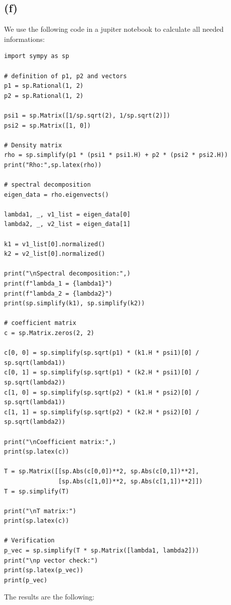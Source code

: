 \documentclass{article}
\begin{document}
\subsection*{(f)}
We use the following code in a jupiter notebook to calculate all needed informations:
\begin{verbatim}
import sympy as sp

# definition of p1, p2 and vectors
p1 = sp.Rational(1, 2)
p2 = sp.Rational(1, 2)

psi1 = sp.Matrix([1/sp.sqrt(2), 1/sp.sqrt(2)])
psi2 = sp.Matrix([1, 0])

# Density matrix
rho = sp.simplify(p1 * (psi1 * psi1.H) + p2 * (psi2 * psi2.H))
print("Rho:",sp.latex(rho))

# spectral decomposition
eigen_data = rho.eigenvects()

lambda1, _, v1_list = eigen_data[0]
lambda2, _, v2_list = eigen_data[1]

k1 = v1_list[0].normalized()
k2 = v2_list[0].normalized()

print("\nSpectral decomposition:",)
print(f"lambda_1 = {lambda1}")
print(f"lambda_2 = {lambda2}")
print(sp.simplify(k1), sp.simplify(k2))

# coefficient matrix
c = sp.Matrix.zeros(2, 2)

c[0, 0] = sp.simplify(sp.sqrt(p1) * (k1.H * psi1)[0] / sp.sqrt(lambda1))
c[0, 1] = sp.simplify(sp.sqrt(p1) * (k2.H * psi1)[0] / sp.sqrt(lambda2))
c[1, 0] = sp.simplify(sp.sqrt(p2) * (k1.H * psi2)[0] / sp.sqrt(lambda1))
c[1, 1] = sp.simplify(sp.sqrt(p2) * (k2.H * psi2)[0] / sp.sqrt(lambda2))

print("\nCoefficient matrix:",)
print(sp.latex(c))

T = sp.Matrix([[sp.Abs(c[0,0])**2, sp.Abs(c[0,1])**2],
               [sp.Abs(c[1,0])**2, sp.Abs(c[1,1])**2]])
T = sp.simplify(T)

print("\nT matrix:")
print(sp.latex(c))

# Verification
p_vec = sp.simplify(T * sp.Matrix([lambda1, lambda2]))
print("\np vector check:")
print(sp.latex(p_vec))
print(p_vec)
\end{verbatim}
The results are the following:
\end{document}
